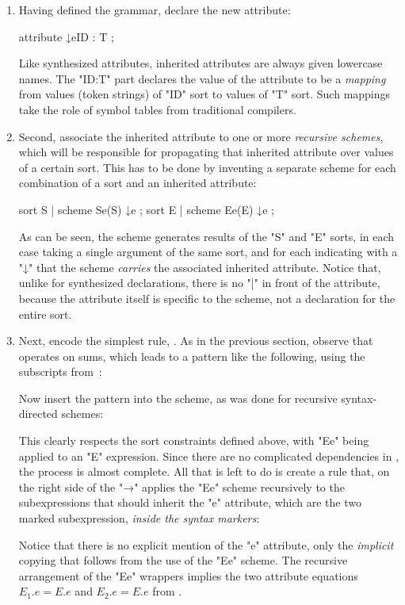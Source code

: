 \documentclass[12pt]{article} %
\begin{document}
\begin{example}
\begin{enumerate}
\item Having defined the grammar, declare the new attribute:
  \begin{hacs}
   attribute ↓e{ID : T} ;
  \end{hacs}
  Like synthesized attributes, inherited attributes are always given lowercase names.  The "{ID:T}"
  part declares the value of the attribute to be a \emph{mapping} from values (token strings) of
  "ID" sort to values of "T" sort. Such mappings take the role of symbol tables from traditional
  compilers.

\item Second, associate the inherited attribute to one or more \emph{recursive schemes}, which will
  be responsible for propagating that inherited attribute over values of a certain sort.  This has
  to be done by inventing a separate scheme for each combination of a sort and an inherited
  attribute:
  \begin{hacs}
   sort S | scheme Se(S) ↓e ;
   sort E | scheme Ee(E) ↓e ;
  \end{hacs}
  As can be seen, the scheme generates results of the "S" and "E" sorts, in each case taking a
  single argument of the same sort, and for each indicating with a "↓" that the scheme
  \emph{carries} the associated inherited attribute. Notice that, unlike for synthesized
  declarations, there is no "|" in front of the attribute, because the attribute itself is specific
  to the scheme, not a declaration for the entire sort.

\item Next, encode the simplest rule, . As in the previous section, observe that
   operates on sums, which leads to a pattern like the following, using the subscripts
  from~:
  Now insert the pattern into the scheme, as was done for recursive syntax-directed schemes:
  This clearly respects the sort constraints defined above, with "Ee" being applied to an "E"
  expression. Since there are no complicated dependencies in , the process is almost
  complete. All that is left to do is create a rule that, on the right side of the "→" applies the
  "Ee" scheme recursively to the subexpressions that should inherit the "e" attribute, which are the
  two marked subexpression, \emph{inside the syntax markers}:
  Notice that there is no explicit mention of the "e" attribute, only the \emph{implicit} copying
  that follows from the use of the "Ee" scheme. The recursive arrangement of the "Ee" wrappers
  implies the two attribute equations $E_1.e=E.e$ and $E_2.e=E.e$ from .


\end{enumerate}
\end{example}
\end{document}
